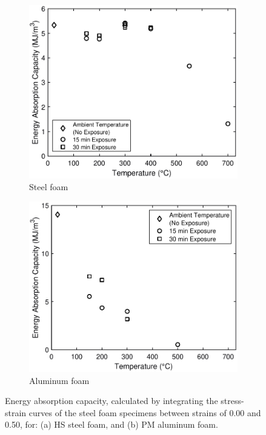 \documentclass[review]{elsarticle}
\begin{document}
\begin{figure}
	\centering
	\begin{subfigure}{0.50\textwidth}
		\centering
		\includegraphics[width=0.90\linewidth]
		{Tex-Figures/Fig21a_Energy_Absorption_Capacity_Steel.pdf}
		\caption{Steel foam}
		\label{fig:energyCapacity_Steel}
	\end{subfigure}%
	\begin{subfigure}{0.50\textwidth}
		\centering
		\includegraphics[width=0.90\linewidth]
		{Tex-Figures/Fig21b_Energy_Absorption_Capacity_Aluminum.pdf}
		\caption{Aluminum foam}
		\label{fig:energyCapacity_Al}
	\end{subfigure}
	\caption{Energy absorption capacity, calculated by integrating the stress-strain curves of the steel foam specimens between strains of 0.00 and 0.50, for: (a) HS steel foam, and (b) PM aluminum foam.}
	\label{fig:energyCapacity}
\end{figure}
\end{document}
